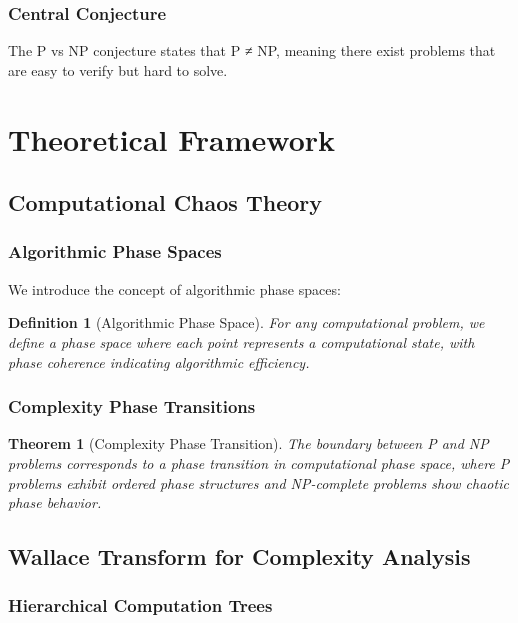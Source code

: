 \documentclass[12pt]{article}
\newtheorem{theorem}{Theorem}
\newtheorem{definition}{Definition}
\begin{document}
\subsubsection{Central Conjecture}

The P vs NP conjecture states that P ≠ NP, meaning there exist problems that are easy to verify but hard to solve.

\section{Theoretical Framework}

\subsection{Computational Chaos Theory}

\subsubsection{Algorithmic Phase Spaces}

We introduce the concept of algorithmic phase spaces:

\begin{definition}[Algorithmic Phase Space]
For any computational problem, we define a phase space where each point represents a computational state, with phase coherence indicating algorithmic efficiency.
\end{definition}

\subsubsection{Complexity Phase Transitions}

\begin{theorem}[Complexity Phase Transition]
The boundary between P and NP problems corresponds to a phase transition in computational phase space, where P problems exhibit ordered phase structures and NP-complete problems show chaotic phase behavior.
\end{theorem}

\subsection{Wallace Transform for Complexity Analysis}

\subsubsection{Hierarchical Computation Trees}
\end{document}
